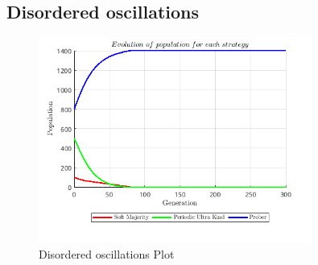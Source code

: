 \subsection{Disordered oscillations}
\begin{figure}[H]
    \centering
    \includegraphics[width=0.8\textwidth]{media/meetings/disordered_oscillations.png}
    \caption{Disordered oscillations Plot}
\end{figure}
